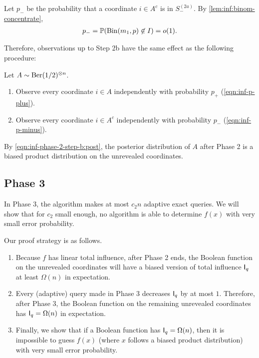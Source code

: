 Let $p_-$ be the probability that a coordinate $i\in A^c$ is in $S^{(2a)}_-$.
By \cref{lem:inf:binom-concentrate},
\begin{align} \label{eqn:inf-p-minus}
  p_- = \mathbb{P}(\operatorname{\mathrm{Bin}}(m_1,p)\not \in I) = o(1).
\end{align}

Therefore, observations up to Step 2b have the same effect as the following procedure:
\begin{definition} \label{defn:inf:alt-obs}
  Let $A\sim \operatorname{\mathrm{Ber}}(1/2)^{\otimes n}$.
  \begin{enumerate}[label=(\arabic*)]
    \item Observe every coordinate $i\in A$ independently with probability $p_+$ (\cref{eqn:inf-p-plus}).
    \item Observe every coordinate $i\in A^c$ independently with probability $p_-$ (\cref{eqn:inf-p-minus}).
  \end{enumerate}
\end{definition}

By \cref{eqn:inf-phase-2-step-b:post}, the posterior distribution of $A$ after Phase 2 is a biased product distribution on the unrevealed coordinates.

\subsection{Phase 3}
In Phase 3, the algorithm makes at most $c_2 n$ adaptive exact queries.
We will show that for $c_2$ small enough, no algorithm is able to determine $f(x)$ with very small error probability.

Our proof strategy is as follows.
\begin{enumerate}[label=3\alph*.]
  \item Because $f$ has linear total influence, after Phase 2 ends, the Boolean function on the unrevealed coordinates will have a biased version of total influence $\operatorname{\mathsf{I}}_q$ at least $\Omega(n)$ in expectation.
  \item Every (adaptive) query made in Phase 3 decreases $\operatorname{\mathsf{I}}_q$ by at most $1$. Therefore, after Phase 3, the Boolean function on the remaining unrevealed coordinates has $\operatorname{\mathsf{I}}_q=\Omega(n)$ in expectation.
  \item Finally, we show that if a Boolean function has $\operatorname{\mathsf{I}}_q=\Omega(n)$, then it is impossible to guess $f(x)$ (where $x$ follows a biased product distribution) with very small error probability.
\end{enumerate}

